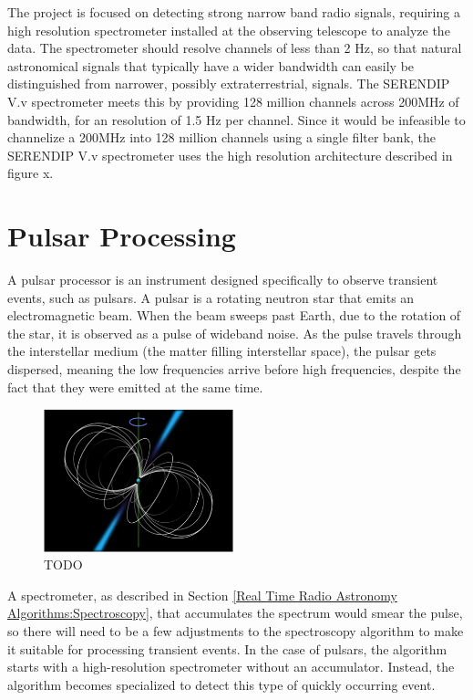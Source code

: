 The project is focused on detecting strong narrow band radio signals, requiring a high resolution spectrometer installed at the observing telescope to analyze the data. 
The spectrometer should resolve channels of less than 2 Hz, so that natural astronomical signals that typically have a wider bandwidth can easily be distinguished from narrower, possibly extraterrestrial, signals. 
The SERENDIP V.v spectrometer meets this by providing 128 million channels across 200MHz of bandwidth, for an resolution of 1.5 Hz per channel. 
Since it would be infeasible to channelize a 200MHz into 128 million channels using a single filter bank, the SERENDIP V.v spectrometer uses the high resolution architecture described in figure x. %






\section{Pulsar Processing}
\label{Real Time Radio Astronomy Algorithms:Pulsar Processing}
A pulsar processor is an instrument designed specifically to observe transient events, such as pulsars. 
A pulsar is a rotating neutron star that emits an electromagnetic beam. 
When the beam sweeps past Earth, due to the rotation of the star, it is observed as a pulse of wideband noise. 
As the pulse travels through the interstellar medium (the matter filling interstellar space), the pulsar gets dispersed, meaning the low frequencies arrive before high frequencies, despite the fact that they were emitted at the same time. 

\begin{figure}
  \centering
    \includegraphics[width=0.49\textwidth]{Images/C2/pulsar.png}
  \caption{TODO}
  \label{fig: C2/pulsar.png}
\end{figure}

A spectrometer, as described in Section \ref{Real Time Radio Astronomy Algorithms:Spectroscopy}, that accumulates the spectrum would smear the pulse, so there will need to be a few adjustments to the spectroscopy algorithm to make it suitable for processing transient events. 
In the case of pulsars, the algorithm starts with a high-resolution spectrometer without an accumulator. 
Instead, the algorithm becomes specialized to detect this type of quickly occurring event.

